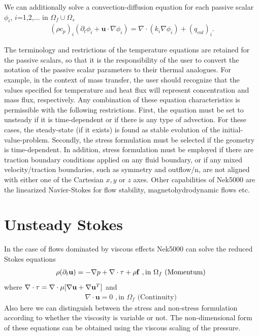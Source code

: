 We can additionally solve a convection-diffusion equation for each passive scalar \(\phi_i\),
\(i\)=1,2,\(\ldots\) in \(\Omega_f \cup \Omega_s\)
\begin{eqnarray}\label{eq:pass_scal}
   (\rho c_{p})_i ( \partial_{t} \phi_{i} + \mathbf u \cdot \nabla \phi_{i} ) =
   \nabla \cdot (k_i \nabla \phi_{i}) + (q_{vol})_i.
\end{eqnarray}

The terminology and
restrictions of the temperature equations are retained for
the passive scalars, so that it is the responsibility of the
user to convert the notation of the passive scalar
parameters to their thermal analogues.
For example, in the context of mass transfer,
the user should recognize that the values specified
for temperature and heat flux
will represent concentration and mass flux, respectively.
Any combination of these equation characteristics is permissible with the
following restrictions. First, the equation must be set to unsteady if it is
time-dependent or if there is any type of advection. For these cases, the
steady-state (if it exists) is found as stable evolution of the
initial-value-problem. Secondly, the stress formulation must be selected if
the geometry is time-dependent. In addition, stress formulation must be
employed if there are traction boundary conditions applied on any fluid
boundary, or if any mixed velocity/traction boundaries, such as symmetry and
outflow/n, are not aligned with either one of the Cartesian \(x,y\) or \(z\) axes.
Other capabilities of Nek5000 are the linearized Navier-Stokes for flow stability, magnetohydrodynamic flows etc.



\section{Unsteady Stokes }
In the case of flows dominated by viscous effects Nek5000 can solve the reduced Stokes equations
\begin{eqnarray}\label{eq:ns_momentum_stokes}
 \rho(\partial_{t} \mathbf u ) = - \nabla p + \nabla \cdot \tau + \rho {\bf f} \,\, , \text{in } \Omega_f \text{  (Momentum)  }
\end{eqnarray}
where \(\nabla \cdot\tau=\nabla\cdot\mu[\nabla \mathbf{u}+\nabla \mathbf{u}^{T}]\) and
\begin{eqnarray}\label{eq:ns_cont_stokes}
 \nabla \cdot \mathbf u =0 \,\, , \text{in } \Omega_f  \text{  (Continuity)  } 
\end{eqnarray}
Also here we can distinguish between the stress and non-stress formulation according to whether the viscosity is variable or not. The non-dimensional form of these equations can be obtained using the viscous scaling of the pressure.


